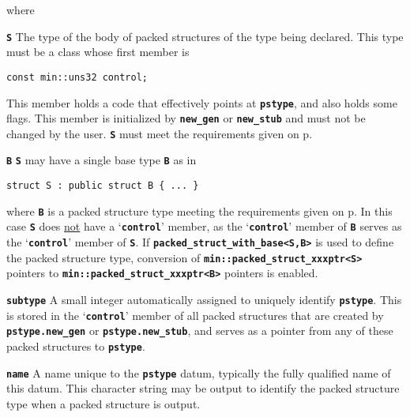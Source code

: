 \documentclass[12pt]{article}
\makeatletter
\newcommand{\TT}[1]{{\tt \bfseries #1}}
\newcommand{\ttmkey}[2]{\TT{#1}\index{#1@{\tt #1}!#2}}
\newcommand{\pagref}[1]{p\pageref{#1}}
\newcommand{\EOL}{\penalty \exhyphenpenalty}
\newenvironment{indpar}[1][0.3in]%
	{\begin{list}{}%
		     {\setlength{\itemsep}{0in}%
		      \setlength{\topsep}{0in}%
		      \setlength{\parsep}{1ex}%
		      \setlength{\labelwidth}{#1}%
		      \setlength{\leftmargin}{#1}%
		      \addtolength{\leftmargin}{\labelsep}}%
	 \item}%
	{\end{list}}
\newenvironment{itemlist}[1][1.2in]%
	{\begin{list}{}{\setlength{\labelwidth}{#1}%
		        \setlength{\leftmargin}{\labelwidth}%
		        \addtolength{\leftmargin}{+0.2in}%
		        \renewcommand{\makelabel}[1]{##1\hfill}}}%
	{\end{list}}
\makeatother
\begin{document}
where

\begin{itemlist}[0.5in]

\item[\TT{S}]
The type of the body of packed structures of the type being
declared.  This type must be a class whose first
member is
\begin{center}
\verb|const min::uns32 control;|
\end{center}
This member holds a code that effectively
points at \TT{pstype}, and also holds some flags.
This member is initialized by \TT{new\_gen} or \TT{new\_stub} and must not
be changed by the user.
\TT{S} must meet the requirements given on
\pagref{PACKED-STRUCTURE-TYPE-REQUIREMENTS}.

\item[\TT{B}]
\TT{S} may have a single base type \TT{B} as in
\begin{indpar}\begin{verbatim}
struct S : public struct B { ... }
\end{verbatim}\end{indpar}
where \TT{B} is a packed structure type meeting the requirements given
on \pagref{PACKED-STRUCTURE-TYPE-REQUIREMENTS}.
In this case \TT{S} does
\underline{not} have a `\TT{control}' member, as
the `\TT{control}' member of \TT{B} serves as
the `\TT{control}' member of \TT{S}.
If \TT{packed\_\EOL struct\_\EOL with\_\EOL base<S,B>}
is used to define the packed structure type, conversion of
\TT{min::\EOL packed\_\EOL struct\_\EOL xxxptr<S>} pointers
to \TT{min::\EOL packed\_\EOL struct\_\EOL xxxptr<B>}
pointers is enabled.

\end{itemlist}

\begin{itemlist}[0.8in]

\item[\ttmkey{subtype}{in {\tt min::packed\_struct}}]
A small integer automatically assigned to uniquely identify \TT{pstype}.
This is stored in the `\TT{control}' member of all packed
structures that are created by \TT{pstype.new\_\EOL gen} or
\TT{pstype.new\_\EOL stub}, and serves as a pointer from any
of these packed structures to \TT{pstype}.

\item[\ttmkey{name}{in {\tt min::packed\_struct}}]
\label{NAME_IN_PACKED_STRUCT}
A name unique to the \TT{pstype} datum, typically the
fully qualified name of this datum.  This character string may
be output to identify the packed structure type when a packed structure is
output.

\end{itemlist}
\end{document}
